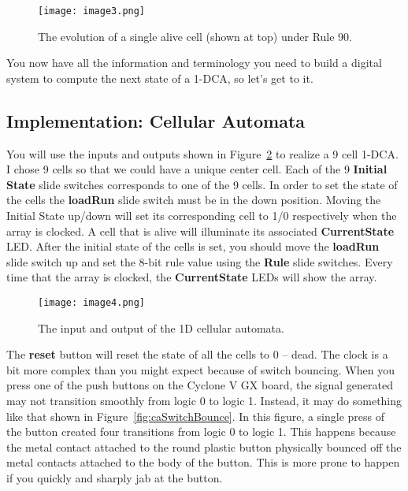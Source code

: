 \begin{figure}[ht]
    \texttt{[image: image3.png]}
    \caption{The evolution of a single alive cell (shown at top) under Rule 90.}
    \label{fig:caEvolution}
\end{figure}

You now have all the information and terminology you need to build a
digital system to compute the next state of a 1-DCA, so let's get to it.

\subsection{Implementation: Cellular Automata}

You will use the inputs and outputs shown in Figure~\ref{fig:caDevBoard} to realize a
9 cell 1-DCA. I chose 9 cells so that we could have a unique center
cell. Each of the 9 \textbf{Initial State} slide switches corresponds to
one of the 9 cells. In order to set the state of the cells the
\textbf{loadRun} slide switch must be in the down position. Moving the
Initial State up/down will set its corresponding cell to 1/0
respectively when the array is clocked. A cell that is alive will
illuminate its associated \textbf{CurrentState} LED. After the initial
state of the cells is set, you should move the \textbf{loadRun} slide
switch up and set the 8-bit rule value using the \textbf{Rule} slide
switches. Every time that the array is clocked, the
\textbf{CurrentState} LEDs will show the array.

\begin{figure}[ht]
    \texttt{[image: image4.png]}
    \caption{The input and output of the 1D cellular automata.}
    \label{fig:caDevBoard}
\end{figure}

The \textbf{reset} button will reset the state of all the cells to 0 --
dead. The clock is a bit more complex than you might expect because of
switch bouncing. When you press one of the push buttons on the Cyclone V
GX board, the signal generated may not transition smoothly from logic 0
to logic 1. Instead, it may do something like that shown in Figure~\ref{fig:caSwitchBounce}. In
this figure, a single press of the button created four transitions from
logic 0 to logic 1. This happens because the metal contact attached to
the round plastic button physically bounced off the metal contacts
attached to the body of the button. This is more prone to happen if you
quickly and sharply jab at the button.

